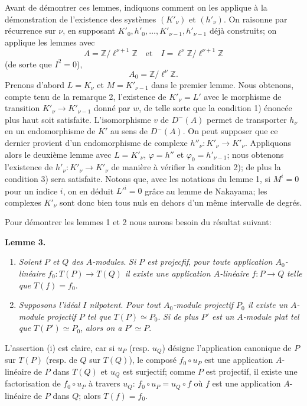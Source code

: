 \documentclass[11pt]{article}
\newenvironment{statement}[1]{\par\medskip\noindent\textbf{#1.}\ }{\par\medskip}
\begin{document}
Avant de démontrer ces lemmes, indiquons comment on les applique à la démonstration de l'existence des systèmes $(K'_\nu)$ et $(h'_\nu)$. On raisonne par récurrence sur $\nu$, en supposant $K'_0,h'_0,\ldots,K'_{\nu-1},h'_{\nu-1}$ déjà construits; on applique les lemmes avec
\[
A=\mathbb Z/\ell^{\nu+1}\mathbb Z
\quad\text{et}\quad
I=\ell^\nu\mathbb Z/\ell^{\nu+1}\mathbb Z
\]
(de sorte que $I^2=0$),
\[
A_0=\mathbb Z/\ell^\nu\mathbb Z.
\]
Prenons d'abord $L=K_\nu$ et $M=K'_{\nu-1}$ dans le premier lemme. Nous obtenons, compte tenu de la remarque 2, l'existence de $K'_\nu=L'$ avec le morphisme de transition $K'_\nu\to K'_{\nu-1}$ donné par $w$, de telle sorte que la condition 1) énoncée plus haut soit satisfaite. L'isomorphisme $v$ de $D^-(A)$ permet de transporter $h_\nu$ en un endomorphisme de $K'$ au sens de $D^-(A)$. On peut supposer que ce dernier provient d'un endomorphisme de complexe $h''_\nu:K'_\nu\to K'_\nu$. Appliquons alors le deuxième lemme avec $L=K'_\nu$, 
$\varphi=h''$ et $\varphi_0=h'_{\nu-1}$;
nous obtenons l'existence de $h'_\nu:K'_\nu\to K'_\nu$ de manière à vérifier la condition 2); de plus la condition 3) sera satisfaite. Notons que, avec les notations du lemme 1, si $M^i=0$ pour un indice $i$, on en déduit $L'^i=0$ grâce au lemme de Nakayama; les complexes $K'_\nu$ sont donc bien tous nuls en dehors d'un même intervalle de degrés.

Pour démontrer les lemmes 1 et 2 nous aurons besoin du résultat suivant:

\begin{statement}{Lemme 3}
\begin{enumerate}[label=(\roman*)]
\item \emph{Soient $P$ et $Q$ des $A$-modules}. \emph{Si $P$ est projecfif}, \emph{pour toute application $A_0$-linéaire} $f_0:T(P)\to T(Q)$ \emph{il existe une application $A$-linéaire} $f:P\to Q$ \emph{telle que} $T(f)=f_0$.
\item \emph{Supposons l'idéal $I$ nilpotent}. \emph{Pour tout $A_0$-module projectif $P_0$ il existe un $A$-module projectif $P$ tel que} $T(P)\simeq P_0$. \emph{Si de plus $P'$ est un $A$-module plat tel que} $T(P')\simeq P_0$, \emph{alors on a} $P'\simeq P$.
\end{enumerate}
\end{statement}

L'assertion (i) est claire, car si $u_P$ (resp. $u_Q$) désigne l'application canonique de $P$ sur $T(P)$ (resp. de $Q$ sur $T(Q)$), le composé $f_0\circ u_P$ est une application $A$-linéaire de $P$ dans $T(Q)$ et $u_Q$ est surjectif; comme $P$ est projectif, il existe une factorisation de $f_0\circ u_P$ à travers $u_Q$: $f_0\circ u_P=u_Q\circ f$ où $f$ est une application $A$-linéaire de $P$ dans $Q$; alors $T(f)=f_0$.
\end{document}

